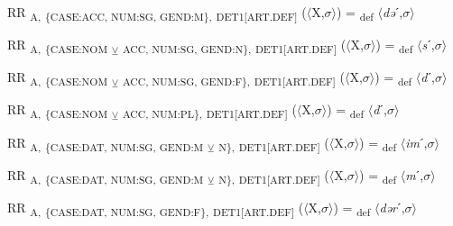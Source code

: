 {\begin{exe}
 RR \textsubscript{A,} \textsubscript{\{CASE:ACC, NUM:SG, GEND:M\},} \textsubscript{DET1[ART.DEF]} ($\langle$X,$\sigma $$\rangle$) = \textsubscript{def} $\langle$\textit{də}ˊ,$\sigma $$\rangle$
\end{exe}

\begin{exe}
 RR \textsubscript{A,} \textsubscript{\{CASE:NOM} \textsubscript{${\veebar}$}\textsubscript{ ACC, NUM:SG, GEND:N\},} \textsubscript{DET1[ART.DEF]} ($\langle$X,$\sigma $$\rangle$) = \textsubscript{def} $\langle$\textit{s}ˊ,$\sigma $$\rangle$
\end{exe}

\begin{exe}
 RR \textsubscript{A,} \textsubscript{\{CASE:NOM} \textsubscript{${\veebar}$}\textsubscript{ ACC, NUM:SG, GEND:F\},} \textsubscript{DET1[ART.DEF]} ($\langle$X,$\sigma $$\rangle$) = \textsubscript{def} $\langle$\textit{d}ˊ,$\sigma $$\rangle$
\end{exe}

\begin{exe}
 RR \textsubscript{A,} \textsubscript{\{CASE:NOM} \textsubscript{${\veebar}$}\textsubscript{ ACC, NUM:PL\},} \textsubscript{DET1[ART.DEF]} ($\langle$X,$\sigma $$\rangle$) = \textsubscript{def} $\langle$\textit{d}ˊ,$\sigma $$\rangle$
\end{exe}

\begin{exe}
 RR \textsubscript{A,} \textsubscript{\{CASE:DAT, NUM:SG, GEND:M} \textsubscript{${\veebar}$}\textsubscript{ N\},} \textsubscript{DET1[ART.DEF]} ($\langle$X,$\sigma $$\rangle$) = \textsubscript{def} $\langle$\textit{im}ˊ,$\sigma $$\rangle$
\end{exe}

\begin{exe}
 RR \textsubscript{A,} \textsubscript{\{CASE:DAT, NUM:SG, GEND:M} \textsubscript{${\veebar}$}\textsubscript{ N\},} \textsubscript{DET1[ART.DEF]} ($\langle$X,$\sigma $$\rangle$) = \textsubscript{def} $\langle$\textit{m}ˊ,$\sigma $$\rangle$
\end{exe}

\begin{exe}
 RR \textsubscript{A,} \textsubscript{\{CASE:DAT, NUM:SG, GEND:F\},} \textsubscript{DET1[ART.DEF]} ($\langle$X,$\sigma $$\rangle$) = \textsubscript{def} $\langle$\textit{dər}ˊ,$\sigma $$\rangle$
\end{exe}

}
